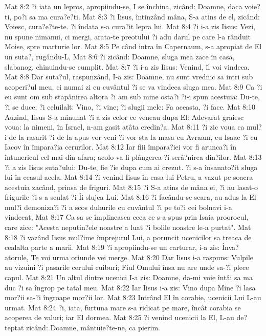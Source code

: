 Mat 8:2  ?i iata un lepros, apropiindu-se, I se închina, zicând: Doamne, daca voie?ti, po?i sa ma cura?e?ti.
Mat 8:3  ?i Iisus, întinzând mâna, S-a atins de el, zicând: Voiesc, cura?e?te-te. ?i îndata s-a cura?it lepra lui.
Mat 8:4  ?i i-a zis Iisus: Vezi, nu spune nimanui, ci mergi, arata-te preotului ?i adu darul pe care l-a rânduit Moise, spre marturie lor.
Mat 8:5  Pe când intra în Capernaum, s-a apropiat de El un suta?, rugându-L,
Mat 8:6  ?i zicând: Doamne, sluga mea zace în casa, slabanog, chinuindu-se cumplit.
Mat 8:7  ?i i-a zis Iisus: Venind, îl voi vindeca.
Mat 8:8  Dar suta?ul, raspunzând, I-a zis: Doamne, nu sunt vrednic sa intri sub acoperi?ul meu, ci numai zi cu cuvântul ?i se va vindeca sluga mea.
Mat 8:9  Ca ?i eu sunt om sub stapânirea altora ?i am sub mine osta?i ?i-i spun acestuia: Du-te, ?i se duce; ?i celuilalt: Vino, ?i vine; ?i slugii mele: Fa aceasta, ?i face.
Mat 8:10  Auzind, Iisus S-a minunat ?i a zis celor ce veneau dupa El: Adevarat graiesc voua: la nimeni, în Israel, n-am gasit atâta credin?a.
Mat 8:11  ?i zic voua ca mul?i de la rasarit ?i de la apus vor veni ?i vor sta la masa cu Avraam, cu Isaac ?i cu Iacov în împara?ia cerurilor.
Mat 8:12  Iar fiii împara?iei vor fi arunca?i în întunericul cel mai din afara; acolo va fi plângerea ?i scrâ?nirea din?ilor.
Mat 8:13  ?i a zis Iisus suta?ului: Du-te, fie ?ie dupa cum ai crezut. ?i s-a însanato?it sluga lui în ceasul acela.
Mat 8:14  ?i venind Iisus în casa lui Petru, a vazut pe soacra acestuia zacând, prinsa de friguri.
Mat 8:15  ?i S-a atins de mâna ei, ?i au lasat-o frigurile ?i s-a sculat ?i Îi slujea Lui.
Mat 8:16  ?i facându-se seara, au adus la El mul?i demoniza?i ?i a scos duhurile cu cuvântul ?i pe to?i cei bolnavi i-a vindecat,
Mat 8:17  Ca sa se împlineasca ceea ce s-a spus prin Isaia proorocul, care zice: "Acesta neputin?ele noastre a luat ?i bolile noastre le-a purtat".
Mat 8:18  ?i vazând Iisus mul?ime împrejurul Lui, a poruncit ucenicilor sa treaca de cealalta parte a marii.
Mat 8:19  ?i apropiindu-se un carturar, i-a zis: Înva?atorule, Te voi urma oriunde vei merge.
Mat 8:20  Dar Iisus i-a raspuns: Vulpile au vizuini ?i pasarile cerului cuiburi; Fiul Omului însa nu are unde sa-?i plece capul.
Mat 8:21  Un altul dintre ucenici I-a zis: Doamne, da-mi voie întâi sa ma duc ?i sa îngrop pe tatal meu.
Mat 8:22  Iar Iisus i-a zis: Vino dupa Mine ?i lasa mor?ii sa-?i îngroape mor?ii lor.
Mat 8:23  Intrând El în corabie, ucenicii Lui L-au urmat.
Mat 8:24  ?i, iata, furtuna mare s-a ridicat pe mare, încât corabia se acoperea de valuri; iar El dormea.
Mat 8:25  ?i venind ucenicii la El, L-au de?teptat zicând: Doamne, mântuie?te-ne, ca pierim.
